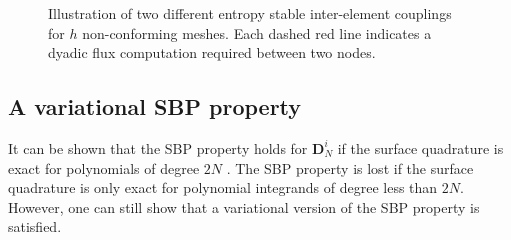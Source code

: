 \documentclass[review]{siamart0216}
\theoremstyle{assumption}
\begin{document}
\begin{figure}[!h]
\centering
\begingroup
\captionsetup[subfigure]{width=.45\textwidth}
\hspace{2em}
\endgroup
\caption{Illustration of two different entropy stable inter-element couplings for $h$ non-conforming meshes.  Each dashed red line indicates a dyadic flux computation required between two nodes. } %
\label{fig:noncon}
\end{figure}


\subsection{A variational SBP property}

It can be shown that the SBP property holds for $\bm{D}^i_N$ if the surface quadrature is exact for polynomials of degree $2N$ \cite{chan2017discretely}.  The SBP property is lost if the surface quadrature is only exact for polynomial integrands of degree less than $2N$.  However, one can still show that a variational version of the SBP property is satisfied.  
\end{document}
